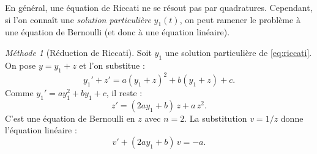 \documentclass[12pt,a4paper,openany]{book}
\theoremstyle{definition}
\theoremstyle{plain}
\theoremstyle{remark}
\newtheorem{methode}[definition]{Méthode}
\begin{document}
En général, une équation de Riccati ne se résout pas par quadratures. Cependant, si l'on connaît une \emph{solution particulière} $y_1(t)$, on peut ramener le problème à une équation de Bernoulli (et donc à une équation linéaire).

\begin{methode}[Réduction de Riccati]
\label{meth:riccati}
Soit $y_1$ une solution particulière de \eqref{eq:riccati}. On pose $y = y_1 + z$ et l'on substitue :
\[
y_1' + z' = a(y_1 + z)^2 + b(y_1 + z) + c.
\]
Comme $y_1' = ay_1^2 + by_1 + c$, il reste :
\[
z' = (2ay_1 + b)\,z + a\,z^2.
\]
C'est une équation de Bernoulli en $z$ avec $n = 2$. La substitution $v = 1/z$ donne l'équation linéaire :
\[
v' + (2ay_1 + b)\,v = -a.
\]
\end{methode}
\end{document}
